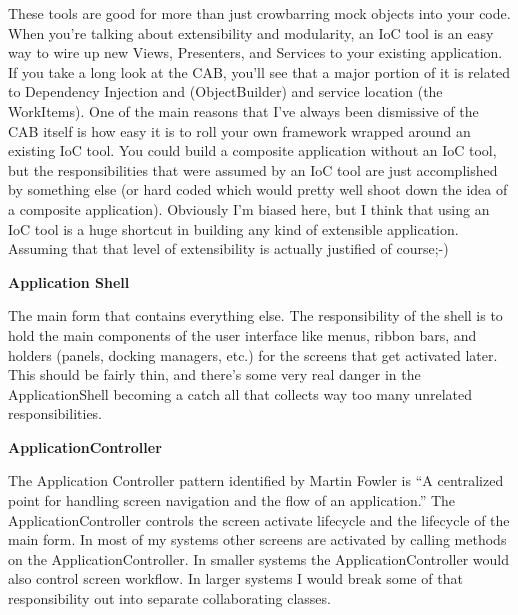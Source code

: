 \documentclass{article}
\begin{document}
{These tools are good for more than just crowbarring mock objects into your code.  When you're talking about extensibility and modularity, an IoC tool is an easy way to wire up new Views, Presenters, and Services to your existing application.  If you take a long look at the CAB, you'll see that a major portion of it is related to Dependency Injection and (ObjectBuilder) and service location (the WorkItems).  One of the main reasons that I've always been dismissive of the CAB itself is how easy it is to roll your own framework wrapped around an existing IoC tool.   You could build a composite application without an IoC tool, but the responsibilities that were assumed by an IoC tool are just accomplished by something else (or hard coded which would pretty well shoot down the idea of a composite application).  Obviously I'm biased here, but I think that using an IoC tool is a huge shortcut in building any kind of extensible application.  Assuming that that level of extensibility is actually justified of course;-)

 
\Large {\textbf{Application Shell}}

The main form that contains everything else.  The responsibility of the shell is to hold the main components of the user interface like menus, ribbon bars, and holders (panels, docking managers, etc.) for the screens that get activated later.  This should be fairly thin, and there's some very real danger in the ApplicationShell becoming a catch all that collects way too many unrelated responsibilities.   

 
\Large {\textbf{ApplicationController}}

The Application Controller pattern identified by Martin Fowler is “A centralized point for handling screen navigation and the flow of an application.”  The ApplicationController controls the screen activate lifecycle and the lifecycle of the main form.  In most of my systems other screens are activated by calling methods on the ApplicationController.  In smaller systems the ApplicationController would also control screen workflow.  In larger systems I would break some of that responsibility out into separate collaborating classes.

}
\end{document}
